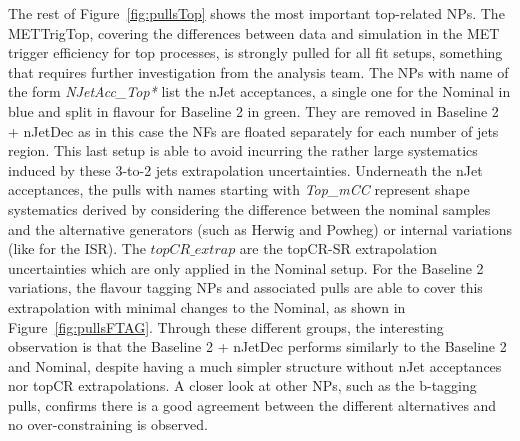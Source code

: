 The rest of Figure~\ref{fig:pullsTop} shows the most important top-related NPs. The METTrigTop, covering the differences between data and simulation in the MET trigger efficiency for top processes, is strongly pulled for all fit setups, something that requires further investigation from the analysis team. The NPs with name of the form \textit{NJetAcc\_Top*} list the nJet acceptances, a single one for the Nominal in blue and split in flavour for Baseline 2 in green. They are removed in Baseline 2 + nJetDec as in this case the NFs are floated separately for each number of jets region. This last setup is able to avoid incurring the rather large systematics induced by these 3-to-2 jets extrapolation uncertainties. Underneath the nJet acceptances, the pulls with names starting with \textit{Top\_mCC} represent shape systematics derived by considering the difference between the nominal samples and the alternative generators (such as Herwig and Powheg) or internal variations (like for the ISR). The $topCR\_extrap$ are the topCR-SR extrapolation uncertainties which are only applied in the Nominal setup. For the Baseline 2 variations, the flavour tagging NPs and associated pulls are able to cover this extrapolation with minimal changes to the Nominal, as shown in Figure~\ref{fig:pullsFTAG}. Through these different groups, the interesting observation is that the Baseline 2 + nJetDec performs similarly to the Baseline 2 and Nominal, despite having a much simpler structure without nJet acceptances nor topCR extrapolations. A closer look at other NPs, such as the b-tagging pulls, confirms there is a good agreement between the different alternatives and no over-constraining is observed. \\

